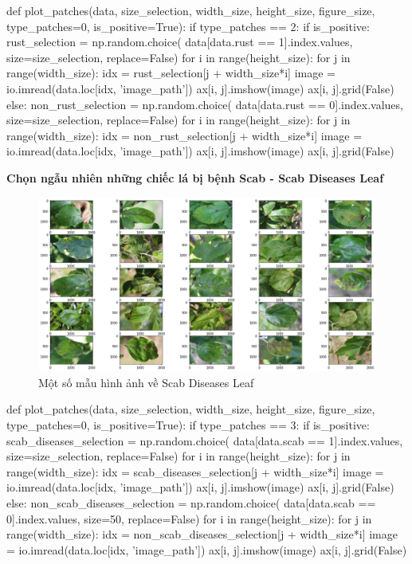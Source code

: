 \documentclass{article}
\begin{document}
	\begin{python}
		def plot_patches(data, size_selection, width_size, height_size, figure_size, type_patches=0, is_positive=True):
			if type_patches == 2:
				if is_positive:
					rust_selection = np.random.choice(
					data[data.rust == 1].index.values, size=size_selection, replace=False)
					for i in range(height_size):
						for j in range(width_size):
							idx = rust_selection[j + width_size*i]
							image = io.imread(data.loc[idx, 'image_path'])
							ax[i, j].imshow(image)
							ax[i, j].grid(False)
				else:
					non_rust_selection = np.random.choice(
					data[data.rust == 0].index.values, size=size_selection, replace=False)
					for i in range(height_size):
						for j in range(width_size):
							idx = non_rust_selection[j + width_size*i]
							image = io.imread(data.loc[idx, 'image_path'])
							ax[i, j].imshow(image)
							ax[i, j].grid(False)
	\end{python}
	\textbf{Chọn ngẫu nhiên những chiếc lá bị bệnh Scab - Scab Diseases Leaf}
	\begin{figure}[H]
		\centering
		\includegraphics[width=1\linewidth]{images/sample_scab_diseases_leaf.png}
		\caption{Một số mẫu hình ảnh về Scab Diseases Leaf}
		\label{fig:writing-thesis}
	\end{figure}
	\begin{python}
		def plot_patches(data, size_selection, width_size, height_size, figure_size, type_patches=0, is_positive=True):
			if type_patches == 3:
				if is_positive:
					scab_diseases_selection = np.random.choice(
					data[data.scab == 1].index.values, size=size_selection, replace=False)
					for i in range(height_size):
						for j in range(width_size):
							idx = scab_diseases_selection[j + width_size*i]
							image = io.imread(data.loc[idx, 'image_path'])
							ax[i, j].imshow(image)
							ax[i, j].grid(False)
				else:
					non_scab_diseases_selection = np.random.choice(
					data[data.scab == 0].index.values, size=50, replace=False)
					for i in range(height_size):
						for j in range(width_size):
							idx = non_scab_diseases_selection[j + width_size*i]
							image = io.imread(data.loc[idx, 'image_path'])
							ax[i, j].imshow(image)
							ax[i, j].grid(False)
	\end{python}
\end{document}
